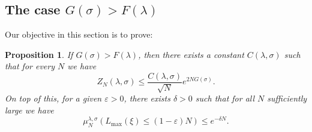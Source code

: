 \documentclass[reqno,11pt]{amsart}
\numberwithin{equation}{section}
\newcommand{\gep}{\varepsilon}       %
\newcommand{\gl}{\lambda}
\newcommand{\gs}{\sigma}
\newtheorem{proposition}[theorem]{Proposition}
\begin{document}
\subsection{The case $G(\sigma)>F(\gl)$}\label{sec:gbiggerf}

Our objective in this section is to prove: 
\begin{proposition}\label{th:upasymptareadom}
If $G(\sigma)>F(\gl)$, 
then there exists a constant $C(\gl, \gs)$ such that for every $N$ we have
\begin{equation}\label{spoof}
 Z_N(\gl,\sigma)\le \frac{C(\gl,\gs)}{\sqrt{N}} e^{2N G(\sigma)}.
\end{equation}
On top of this, for a given $\gep>0$, there exists $\delta>0$ such that for all $N$ sufficiently large  we have 
\begin{equation}\label{aredom:excurdecay}
 \mu^{\gl,\sigma}_{N}( L_{\max}(\xi)\le (1-\gep) N )\le e^{-\delta N}.
\end{equation}

\end{proposition}
\end{document}
